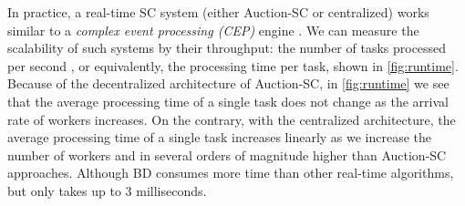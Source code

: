 In practice, a real-time SC system (either Auction-SC or centralized) works similar to a \emph{complex event processing (CEP)} engine \cite{Luckham01}. We can measure the scalability of such systems by their throughput: the number of tasks processed per second , or equivalently, the processing time per task, shown in \cref{fig:runtime}. Because of the decentralized architecture of Auction-SC, in \cref{fig:runtime} we see that the average processing time of a single task does not change as the arrival rate of workers increases. On the contrary, with the centralized architecture, the average processing time of a single task increases linearly as we increase the number of workers and in several orders of magnitude higher than Auction-SC approaches. Although BD consumes more time than other real-time algorithms, but only takes up to 3 milliseconds.

